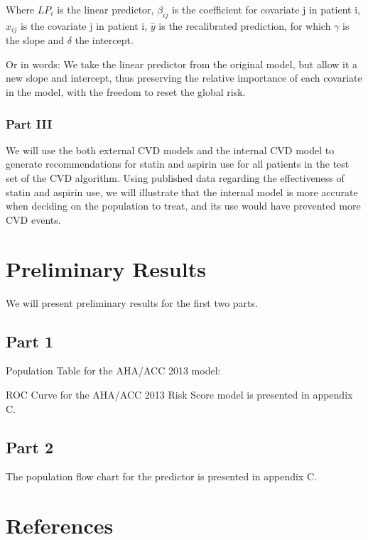 \documentclass[a4paper,12pt]{article}
\begin{document}
		Where $ LP_i $ is the linear predictor, $ \beta_{ij} $ is the coefficient for covariate j in patient i, $ x_{ij} $ is the covariate j in patient i, $ \hat{y} $ is the recalibrated prediction, for which $ \gamma $ is the slope and $ \delta $ the intercept.
		
		Or in words: We take the linear predictor from the original model, but allow it a new slope and intercept, thus preserving the relative importance of each covariate in the model, with the freedom to reset the global risk.
		
		\subsubsection{Part III}
		We will use the both external CVD models and the internal CVD model to generate recommendations for statin and aspirin use for all patients in the test set of the CVD algorithm. Using published data regarding the effectiveness of statin and aspirin use, we will illustrate that the internal model is more accurate when deciding on the population to treat, and its use would have prevented more CVD events.
		
	\section{Preliminary Results}
	We will present preliminary results for the first two parts.

	\subsection{Part 1}

	Population Table for the AHA/ACC 2013 model\cite{Goff2014}:

	
	ROC Curve for the AHA/ACC 2013 Risk Score model is presented in appendix C.
	
	\subsection{Part 2}
	
	The population flow chart for the predictor is presented in appendix C.
	
	\section{References}
	
\end{document}
